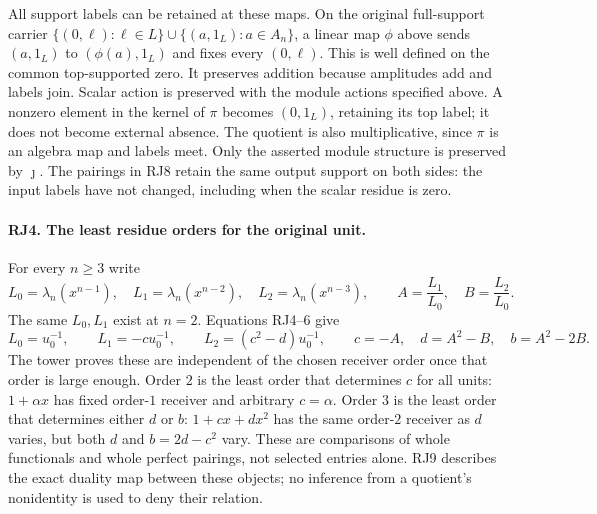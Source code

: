 All support labels can be retained at these maps. On the original
full-support carrier $\{(0,\ell):\ell\in L\}\cup
\{(a,1_L):a\in A_n\}$, a linear map $\phi$ above sends
$(a,1_L)$ to $(\phi(a),1_L)$ and fixes every $(0,\ell)$.
This is well defined on the common top-supported zero. It preserves
addition because amplitudes add and labels join. Scalar action is
preserved with the module actions specified above. A nonzero element
in the kernel of $\pi$ becomes $(0,1_L)$, retaining its top label;
it does not become external absence. The quotient is also
multiplicative, since $\pi$ is an algebra map and labels meet.
Only the asserted module structure is preserved by $\jmath$.
The pairings in RJ8 retain the same output support on both sides:
the input labels have not changed, including when the scalar residue
is zero.

\paragraph{RJ4. The least residue orders for the original unit.}
For every $n\ge3$ write
\[
 L_0=\lambda_n(x^{n-1}),\quad L_1=\lambda_n(x^{n-2}),\quad
 L_2=\lambda_n(x^{n-3}),\qquad A=\frac{L_1}{L_0},\quad
 B=\frac{L_2}{L_0}.
 \tag{RJ10}
\]
The same $L_0,L_1$ exist at $n=2$. Equations RJ4--6 give
\[
 L_0=u_0^{-1},\qquad L_1=-cu_0^{-1},\qquad
 L_2=(c^2-d)u_0^{-1},
 \qquad\boxed{c=-A,\quad d=A^2-B,\quad b=A^2-2B.}
 \tag{RJ11}
\]
The tower proves these are independent of the chosen receiver order
once that order is large enough. Order $2$ is the least order that
determines $c$ for all units: $1+\alpha x$ has fixed order-$1$
receiver and arbitrary $c=\alpha$. Order $3$ is the least order
that determines either $d$ or $b$: $1+c x+d x^2$ has the same
order-$2$ receiver as $d$ varies, but both $d$ and $b=2d-c^2$
vary. These are comparisons of whole functionals and whole perfect
pairings, not selected entries alone. RJ9 describes the exact
duality map between these objects; no inference from a quotient's
nonidentity is used to deny their relation.

